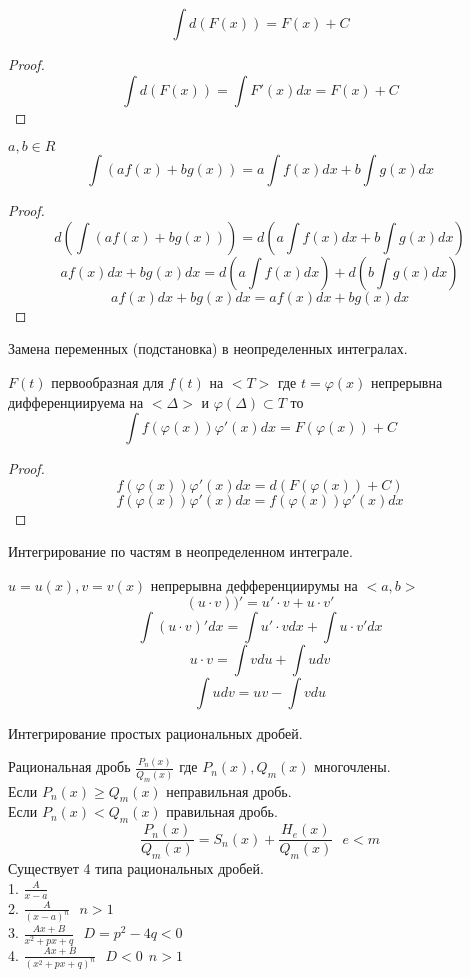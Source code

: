  \[\int d(F(x)) = F(x) + C\]
\begin{proof}
  \[\int d(F(x)) = \int F'(x)dx = F(x) + C\]
\end{proof}


$a, b \in R$\\
\[\int (af(x) + bg(x)) = a \int f(x)dx + b \int g(x)dx\]
\begin{proof}
  $$
  d \left( \int (af(x) + bg(x)) \right) =
  d \left( a \int f(x)dx + b \int g(x)dx \right)
  $$
  $$
  a f(x)dx + b g(x)dx =
  d \left( a \int f(x)dx \right) +
  d \left( b \int g(x)dx \right)
  $$
  $$
  a f(x)dx + b g(x)dx =  a f(x)dx + b g(x)dx
  $$
\end{proof}

\begin{title}[\Large]
  Замена переменных (подстановка) в неопределенных интегралах.
\end{title}

\begin{theorem}
  $F(t)$ первообразная для $f(t)$ на $<T>$ где $t = \varphi (x)$
  непрерывна дифференциируема на $<\Delta>$ и $\varphi(\Delta) \subset T$ то
  \[\int f(\varphi (x)) \varphi'(x)dx = F(\varphi (x)) + C\]
\end{theorem}

\begin{proof}
  \[
 f(\varphi(x)) \varphi'(x) dx = d(F(\varphi(x)) + C)
  \]
 \[
 f(\varphi(x)) \varphi'(x) dx = f(\varphi(x)) \varphi'(x) dx
 \]
\end{proof}

\begin{title}[\Large]
  Интегрирование по частям в неопределенном интеграле.
\end{title}
$u = u(x), v = v(x)$ непрерывна дефференциирумы на $<a,b>$
$$(u\cdot v))' = u'\cdot v + u\cdot v'$$
$$\int(u \cdot v)'dx = \int u'\cdot vdx + \int u\cdot v'dx$$
$$u\cdot v = \int vdu + \int udv$$
\[\int udv = uv - \int vdu\]

\begin{title}[\Large]
  Интегрирование простых рациональных дробей.
\end{title}
Рациональная дробь $\frac{P_n(x)}{Q_m(x)}$ где $P_n(x), Q_m(x)$ многочлены.\\
Если $P_n(x) \ge Q_m(x)$ неправильная дробь.\\
Если $P_n(x) < Q_m(x)$ правильная дробь.
$$
\frac{P_n(x)}{Q_m(x)} = S_n(x) + \frac{H_e(x)}{Q_m(x)} ~~~ e < m
$$
Существует 4 типа рациональных дробей.\\
1. $\frac{A}{x-a}$\\
2. $\frac{A}{(x-a)^n} ~~~ n > 1$\\
3. $\frac{Ax + B}{x^2 + px +q} ~~~ D = p^2 - 4q < 0$\\
4. $\frac{Ax + B}{(x^2 + px +q)^n} ~~~ D < 0 ~~ n > 1$\\

